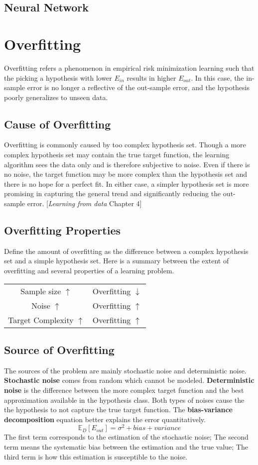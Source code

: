 \documentclass[9pt]{article}
\begin{document}
\subsection{Neural Network}

\newpage
\section{Overfitting}
Overfitting refers a phenomenon in empirical risk minimization learning such that the picking a hypothesis with lower $E_{in}$ results in higher $E_{out}$. In this case, the in-sample error is no longer a reflective of the out-sample error, and the hypothesis poorly generalizes to unseen data.
\subsection{Cause of Overfitting}
Overfitting is commonly caused by too complex hypothesis set. Though a more complex hypothesis set may contain the true target function, the learning algorithm sees the data only and is therefore subjective to noise. Even if there is no noise, the target function may be more complex than the hypothesis set and there is no hope for a perfect fit. In either case, a simpler hypothesis set is more promising in capturing the general trend and significantly reducing the out-sample error. [\textit{Learning from data}  Chapter 4]
\subsection{Overfitting Properties}
Define the amount of overfitting as the difference between a complex hypothesis set and a simple hypothesis set. Here is a summary between the extent of overfitting and several properties of a learning problem.
\begin{center}
\begin{tabular}{ |c c| } 
 \hline
Sample size $\uparrow$ & Overfitting $\downarrow$\\
Noise $\uparrow$ & Overfitting $\uparrow$\\
Target Complexity $\uparrow$ & Overfitting $\uparrow$\\
 \hline
\end{tabular}
\end{center}

\subsection{Source of Overfitting}
The sources of the problem are mainly stochastic noise and deterministic noise. \textbf{Stochastic noise} comes from random which cannot be modeled. \textbf{Deterministic noise} is the difference between the more complex target function and the best approximation available in the hypothesis class. Both types of noises cause the the hypothesis to not capture the true target function. The \textbf{bias-variance decomposition} equation better explains the error quantitatively. 
$$
\mathbb{E}_{D}[E_{out}] = \sigma^2 + bias + variance
$$
The first term corresponds to the estimation of the stochastic noise; The second term means the systematic bias between the estimation and the true value; The third term is how this estimation is susceptible to the noise. 
\end{document}
